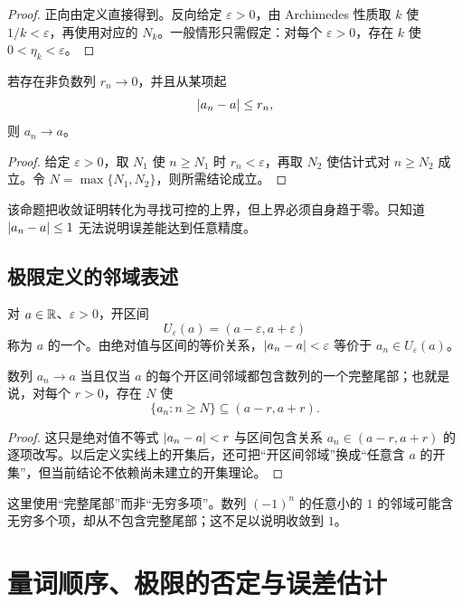 \begin{proof}
正向由定义直接得到。反向给定 \(\varepsilon>0\)，由 Archimedes 性质取 \(k\) 使 \(1/k<\varepsilon\)，再使用对应的 \(N_k\)。一般情形只需假定：对每个 \(\varepsilon>0\)，存在 \(k\) 使 \(0<\eta_k<\varepsilon\)。
\end{proof}

\begin{proposition}[最终误差函数]
若存在非负数列 \(r_n\to0\)，并且从某项起
\[
 \left|a_n-a\right|\le r_n,
\]
则 \(a_n\to a\)。
\end{proposition}

\begin{proof}
给定 \(\varepsilon>0\)，取 \(N_1\) 使 \(n\ge N_1\) 时 \(r_n<\varepsilon\)，再取 \(N_2\) 使估计式对 \(n\ge N_2\) 成立。令 \(N=\max\{N_1,N_2\}\)，则所需结论成立。
\end{proof}

该命题把收敛证明转化为寻找可控的上界，但上界必须自身趋于零。只知道 \(\left|a_n-a\right|\le1\) 无法说明误差能达到任意精度。

\subsection{极限定义的邻域表述}

对 \(a\in\mathbb{R}\)、\(\varepsilon>0\)，开区间
\[
 U_\varepsilon(a)=(a-\varepsilon,a+\varepsilon)
\]
称为 \(a\) 的一个。由绝对值与区间的等价关系，\(\left|a_n-a\right|<\varepsilon\) 等价于 \(a_n\in U_\varepsilon(a)\)。

\begin{theorem}[邻域刻画]
数列 \(a_n\to a\) 当且仅当 \(a\) 的每个开区间邻域都包含数列的一个完整尾部；也就是说，对每个 \(r>0\)，存在 \(N\) 使
\[
 \{a_n:n\ge N\}\subseteq(a-r,a+r).
\]
\end{theorem}

\begin{proof}
这只是绝对值不等式
\(
 \left|a_n-a\right|<r
\)
与区间包含关系
\(
 a_n\in(a-r,a+r)
\)
的逐项改写。以后定义实线上的开集后，还可把“开区间邻域”换成“任意含 \(a\) 的开集”，但当前结论不依赖尚未建立的开集理论。
\end{proof}

这里使用“完整尾部”而非“无穷多项”。数列 \((-1)^n\) 的任意小的 \(1\) 的邻域可能含无穷多个项，却从不包含完整尾部；这不足以说明收敛到 \(1\)。

\section{量词顺序、极限的否定与误差估计}

